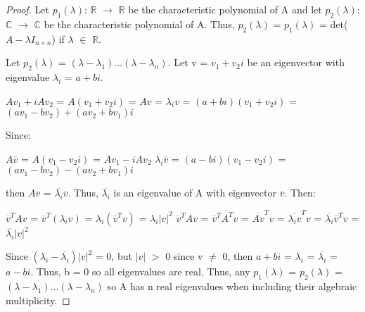     \begin{proof}
        Let $p_1(\lambda)$: $\mathbb{R}$ $\rightarrow$ $\mathbb{R}$
        be the characteristic polynomial of A and
        let $p_2(\lambda)$: $\mathbb{C}$ $\rightarrow$ $\mathbb{C}$
        be the characteristic polynomial of A.
        Thus, $p_2(\lambda)$ = $p_1(\lambda)$ = det($A - \lambda I_{n \times n}$)
        if $\lambda$ $\in$ $\mathbb{R}$.

        Let $p_2(\lambda)$ = $(\lambda - \lambda_1)...(\lambda - \lambda_n)$.
        Let v = $v_1 + v_2i$ be an eigenvector with eigenvalue
        $\lambda_i$ = $a + bi$.

        \hspace{0.5cm}
        $Av_1 + iAv_2$
        = $A(v_1+v_2i)$
        = $Av$
        = $\lambda_i v$
        = $(a+bi)(v_1 + v_2i)$
        = $(av_1 - bv_2) + (av_2 + bv_1)i$

        Since:

        \hspace{0.5cm}
        $A\overline{v}$
        = $A(v_1 - v_2i)$
        = $Av_1 - iAv_2$
        \hspace{1cm}
        $\overline{\lambda_i} \overline{v}$
        = $(a-bi)(v_1 - v_2i)$
        = $(av_1 - bv_2) - (av_2 + bv_1)i$

        then $A\overline{v}$ = $\overline{\lambda_i} \overline{v}$.
        Thus, $\overline{\lambda_i}$ is an eigenvalue of A with eigenvector
        $\overline{v}$. Then:

        \hspace{0.5cm}
        $\overline{v}^T Av$
        = $\overline{v}^T (\lambda_i v)$
        = $\lambda_i(\overline{v}^T v)$
        = $\lambda_i |v|^2$
        \hspace{0.5cm}
        $\overline{v}^T Av$
        = $\overline{v}^T \overline{A^T} v$
        = $\overline{Av}^T v$
        = $\overline{\lambda_i v}^T v$
        = $\overline{\lambda_i} \overline{v}^T v$
        = $\overline{\lambda_i} |v|^2$

        Since $(\lambda_i - \overline{\lambda_i})|v|^2$ = 0,
        but $|v|$ $>$ 0 since v $\not =$ 0, then
        $a+bi$ = $\lambda_i$ = $\overline{\lambda_i}$ = $a-bi$.
        Thus, b = 0 so all eigenvalues are real.
        Thus, any $p_1(\lambda)$ = $p_2(\lambda)$
        = $(\lambda - \lambda_1)...(\lambda - \lambda_n)$
        so A has n real eigenvalues when including their algebraic multiplicity.
    \end{proof}

